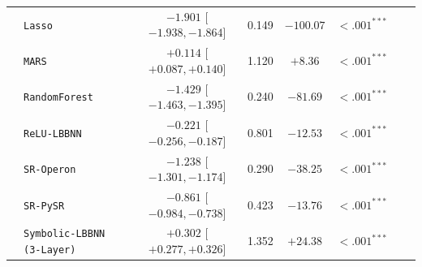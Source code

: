 \begin{table}[htbp]
{{\begin{tabular}{llcccccc}
 & \texttt{Lasso} & $-1.901$ [$-1.938, -1.864$] & 0.149 & $-100.07$ & $<.001^{***}$ &  \\
 & \texttt{MARS} & $+0.114$ [$+0.087, +0.140$] & 1.120 & $+8.36$ & $<.001^{***}$ &  \\
 & \texttt{RandomForest} & $-1.429$ [$-1.463, -1.395$] & 0.240 & $-81.69$ & $<.001^{***}$ &  \\
 & \texttt{ReLU-LBBNN} & $-0.221$ [$-0.256, -0.187$] & 0.801 & $-12.53$ & $<.001^{***}$ &  \\
 & \texttt{SR-Operon} & $-1.238$ [$-1.301, -1.174$] & 0.290 & $-38.25$ & $<.001^{***}$ &  \\
 & \texttt{SR-PySR} & $-0.861$ [$-0.984, -0.738$] & 0.423 & $-13.76$ & $<.001^{***}$ &  \\
 & \texttt{Symbolic-LBBNN (3-Layer)} & $+0.302$ [$+0.277, +0.326$] & 1.352 & $+24.38$ & $<.001^{***}$ &  \\
\bottomrule
\end{tabular}%
}
}
\end{table}

